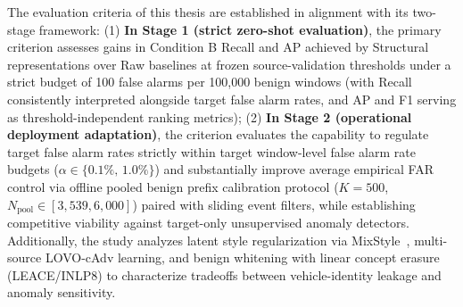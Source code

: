 \documentclass[12pt, a4paper, reqno, oneside]{book}
\begin{document}
The evaluation criteria of this thesis are established in alignment with its two-stage framework: (1) \textbf{In Stage 1 (strict zero-shot evaluation)}, the primary criterion assesses gains in Condition B Recall and AP achieved by Structural representations over Raw baselines at frozen source-validation thresholds under a strict budget of 100 false alarms per 100,000 benign windows (with Recall consistently interpreted alongside target false alarm rates, and AP and F1 serving as threshold-independent ranking metrics); (2) \textbf{In Stage 2 (operational deployment adaptation)}, the criterion evaluates the capability to regulate target false alarm rates strictly within target window-level false alarm rate budgets ($\alpha \in \{0.1\%,\, 1.0\%\}$) and substantially improve average empirical FAR control via offline pooled benign prefix calibration protocol ($K=500$, $N_{\text{pool}} \in [3{,}539, 6{,}000]$) paired with sliding event filters, while establishing competitive viability against target-only unsupervised anomaly detectors. Additionally, the study analyzes latent style regularization via MixStyle~\cite{zhou2021mixstyle}, multi-source LOVO-cAdv learning, and benign whitening with linear concept erasure (LEACE/INLP8) to characterize tradeoffs between vehicle-identity leakage and anomaly sensitivity.
\end{document}
